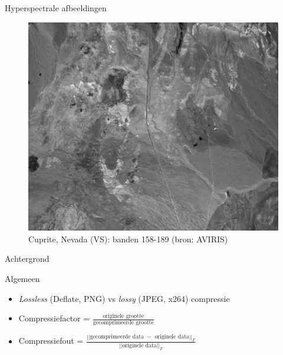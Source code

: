 \documentclass[t,12pt,dutch
\ifx\beamermode\undefined\else,\beamermode\fi
]{beamer}
\begin{document}
\begin{frame}{Hyperspectrale afbeeldingen}

\begin{figure}[H]
\centering
\includegraphics[scale=0.3]{images/cuprite_bands_158-190.png}
\caption{Cuprite, Nevada (VS): banden 158-189 (bron: AVIRIS)}
\end{figure}

\end{frame}

\begin{frame}{}
\begin{center}
\vspace*{\fill}
\vspace*{\fill}
\Huge
Achtergrond
\normalsize
\vspace*{\fill}
\end{center}
\end{frame}

\begin{frame}{Algemeen}

\begin{itemize}
\item \textit{Lossless} (Deflate, PNG) vs \textit{lossy} (JPEG, x264) compressie
\item Compressiefactor = $\frac{\text{originele grootte}}{\text{gecomprimeerde grootte}}$
\item Compressiefout = $\frac{||\text{gecomprimeerde data } - \text{ originele data}||_F}{||\text{originele data}||_F}$
\end{itemize}

\end{frame}
\end{document}
